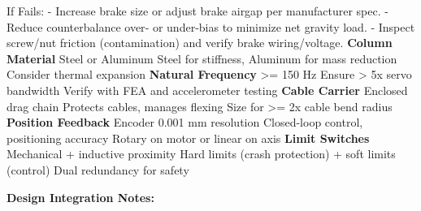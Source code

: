 \documentclass[
]{article}
\begin{document}
If Fails: - Increase brake size or adjust brake airgap per manufacturer
spec. - Reduce counterbalance over‑ or under‑bias to minimize net
gravity load. - Inspect screw/nut friction (contamination) and verify
brake wiring/voltage. \textbar{} \textbf{Column Material} \textbar{}
Steel or Aluminum \textbar{} Steel for stiffness, Aluminum for mass
reduction \textbar{} Consider thermal expansion \textbar{} \textbar{}
\textbf{Natural Frequency} \textbar{} \textgreater= 150 Hz \textbar{}
Ensure \textgreater{} 5x servo bandwidth \textbar{} Verify with FEA and
accelerometer testing \textbar{} \textbar{} \textbf{Cable Carrier}
\textbar{} Enclosed drag chain \textbar{} Protects cables, manages
flexing \textbar{} Size for \textgreater= 2x cable bend radius
\textbar{} \textbar{} \textbf{Position Feedback} \textbar{} Encoder
0.001 mm resolution \textbar{} Closed-loop control, positioning accuracy
\textbar{} Rotary on motor or linear on axis \textbar{} \textbar{}
\textbf{Limit Switches} \textbar{} Mechanical + inductive proximity
\textbar{} Hard limits (crash protection) + soft limits (control)
\textbar{} Dual redundancy for safety \textbar{}

\textbf{Design Integration Notes:}
\end{document}
